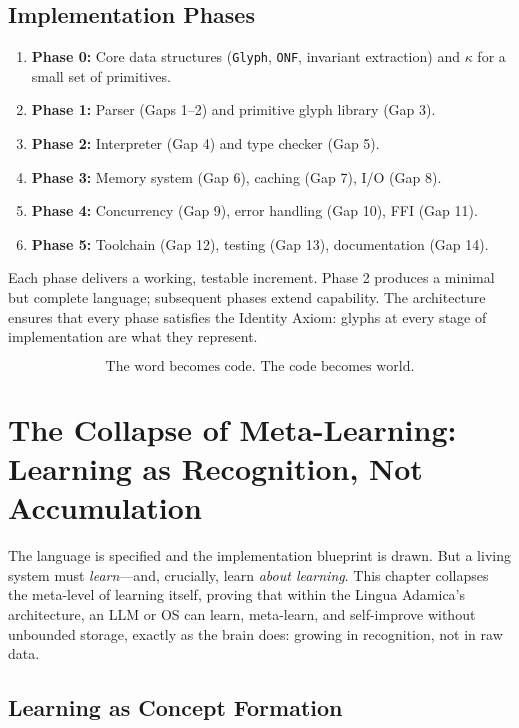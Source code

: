 \documentclass[12pt, letterpaper]{book}
\begin{document}
\section{Implementation Phases}

\begin{enumerate}
    \item \textbf{Phase 0:} Core data structures (\texttt{Glyph}, \texttt{ONF}, invariant extraction) and $\kappa$ for a small set of primitives.
    \item \textbf{Phase 1:} Parser (Gaps 1--2) and primitive glyph library (Gap 3).
    \item \textbf{Phase 2:} Interpreter (Gap 4) and type checker (Gap 5).
    \item \textbf{Phase 3:} Memory system (Gap 6), caching (Gap 7), I/O (Gap 8).
    \item \textbf{Phase 4:} Concurrency (Gap 9), error handling (Gap 10), FFI (Gap 11).
    \item \textbf{Phase 5:} Toolchain (Gap 12), testing (Gap 13), documentation (Gap 14).
\end{enumerate}

Each phase delivers a working, testable increment. Phase 2 produces a minimal but complete language; subsequent phases extend capability. The architecture ensures that every phase satisfies the Identity Axiom: glyphs at every stage of implementation are what they represent.

\[
\boxed{\text{The word becomes code. The code becomes world.}}
\]


\chapter{The Collapse of Meta-Learning: Learning as Recognition, Not Accumulation}\label{ch:learning}

The language is specified and the implementation blueprint is drawn. But a living system must \textit{learn}---and, crucially, learn \textit{about learning}. This chapter collapses the meta-level of learning itself, proving that within the Lingua Adamica's architecture, an LLM or OS can learn, meta-learn, and self-improve without unbounded storage, exactly as the brain does: growing in recognition, not in raw data.

\section{Learning as Concept Formation}
\end{document}
